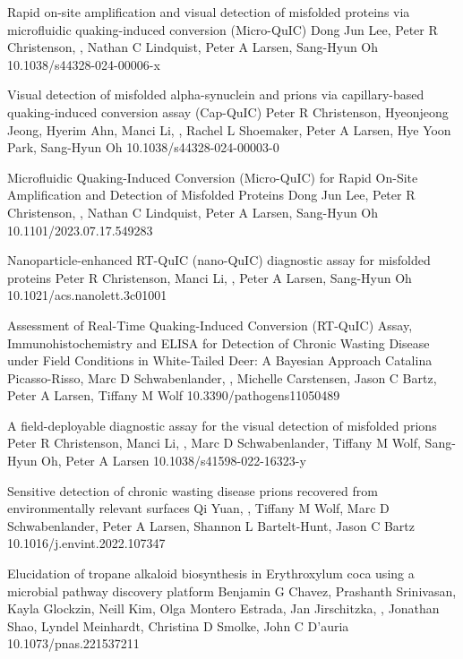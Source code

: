 \documentclass{resume}
\begin{document}
\begin{samepage}
            {Rapid on-site amplification and visual detection of misfolded proteins via microfluidic quaking-induced conversion (Micro-QuIC)}
            {Dong Jun Lee, Peter R Christenson, \me{}, Nathan C Lindquist, Peter A Larsen, Sang-Hyun Oh}
            {10.1038/s44328-024-00006-x}

            {Visual detection of misfolded alpha-synuclein and prions via capillary-based quaking-induced conversion assay (Cap-QuIC)}
            {Peter R Christenson, Hyeonjeong Jeong, Hyerim Ahn, Manci Li, \me{}, Rachel L Shoemaker, Peter A Larsen, Hye Yoon Park, Sang-Hyun Oh}
            {10.1038/s44328-024-00003-0}

            {Microfluidic Quaking-Induced Conversion (Micro-QuIC) for Rapid On-Site Amplification and Detection of Misfolded Proteins}
            {Dong Jun Lee, Peter R Christenson, \me{}, Nathan C Lindquist, Peter A Larsen, Sang-Hyun Oh}
            {10.1101/2023.07.17.549283}

            {Nanoparticle-enhanced RT-QuIC (nano-QuIC) diagnostic assay for misfolded proteins}
            {Peter R Christenson, Manci Li, \me{}, Peter A Larsen, Sang-Hyun Oh}
            {10.1021/acs.nanolett.3c01001}

            {Assessment of Real-Time Quaking-Induced Conversion (RT-QuIC) Assay, Immunohistochemistry and ELISA for Detection of Chronic Wasting Disease under Field Conditions in White-Tailed Deer: A Bayesian Approach}
            {Catalina Picasso-Risso, Marc D Schwabenlander, \me{}, Michelle Carstensen, Jason C Bartz, Peter A Larsen, Tiffany M Wolf}
            {10.3390/pathogens11050489}

            {A field-deployable diagnostic assay for the visual detection of misfolded prions}
            {Peter R Christenson, Manci Li, \me{}, Marc D Schwabenlander, Tiffany M Wolf, Sang-Hyun Oh, Peter A Larsen}
            {10.1038/s41598-022-16323-y}

            {Sensitive detection of chronic wasting disease prions recovered from environmentally relevant surfaces}
            {Qi Yuan, \me{}, Tiffany M Wolf, Marc D Schwabenlander, Peter A Larsen, Shannon L Bartelt-Hunt, Jason C Bartz}
            {10.1016/j.envint.2022.107347}

            {Elucidation of tropane alkaloid biosynthesis in Erythroxylum coca using a microbial pathway discovery platform}
            {Benjamin G Chavez, Prashanth Srinivasan, Kayla Glockzin, Neill Kim, Olga Montero Estrada, Jan Jirschitzka, \me{}, Jonathan Shao, Lyndel Meinhardt, Christina D Smolke, John C D’auria}
            {10.1073/pnas.221537211}


\end{samepage}
\end{document}
